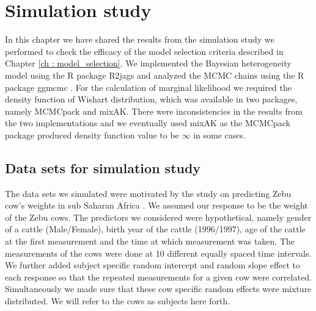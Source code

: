 
\chapter{Simulation study}
\label{ch : simulation_study}

In this chapter we have shared the results from the simulation study we performed to check the efficacy of the model selection criteria described in Chapter \ref{ch : model_selection}. We implemented the Bayesian heterogeneity model using the R package R2jags \citep{su_r2jags:_2015} and analyzed the MCMC chains using the R package ggmcmc \citep{marin_ggmcmc:_2016}. For the calculation of marginal likelihood we required the density function of Wishart distribution, which was available in two packages, namely MCMCpack and mixAK. There were inconsistencies in the results from the two implementations and we eventually used mixAK \citep{komarek_mixak:_2015} as the MCMCpack package produced density function value to be $\infty$ in some cases.

\section{Data sets for simulation study}
The data sets we simulated were motivated by the study on predicting Zebu cow's weights in sub Saharan Africa \citep{lesosky_live_2012}. We assumed our response to be the weight of the Zebu cows. The predictors we considered were hypothetical, namely gender of a cattle (Male/Female), birth year of the cattle (1996/1997), age of the cattle at the first measurement and the time at which measurement was taken. The measurements of the cows were done at 10 different equally spaced time intervals. We further added subject specific random intercept and random slope effect to each response so that the repeated measurements for a given cow were correlated. Simultaneously we made sure that these cow specific random effects were mixture distributed. We will refer to the cows as subjects here forth.

